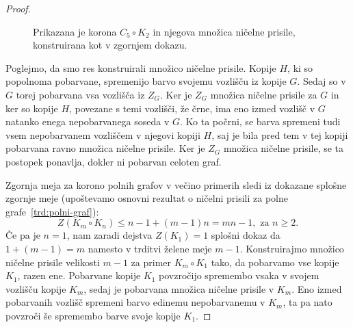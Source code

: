 \documentclass[12pt,a4paper,twoside]{article}
\theoremstyle{definition} %
\theoremstyle{plain} %
\numberwithin{equation}{section}  %
\begin{document}
\begin{proof}
\begin{figure}[h]
        \caption{Prikazana je korona $C_5 \circ K_2$ in njegova množica ničelne prisile, konstruirana kot v zgornjem dokazu.}
        \label{fig:zf-korona}
    \end{figure}
    
    Poglejmo, da smo res konstruirali množico ničelne prisile. Kopije $H$, ki so popolnoma pobarvane, spremenijo barvo svojemu vozlišču iz kopije $G$. Sedaj so v $G$ torej pobarvana vsa vozlišča iz $Z_G$. Ker je $Z_G$ množica ničelne prisile za $G$ in ker so kopije $H$, povezane s temi vozlišči, že črne, ima eno izmed vozlišč v $G$ natanko enega nepobarvanega soseda v $G$. Ko ta počrni, se barva spremeni tudi vsem nepobarvanem vozliščem v njegovi kopiji $H$, saj je bila pred tem v tej kopiji pobarvana ravno množica ničelne prisile. Ker je $Z_G$ množica ničelne prisile, se ta postopek ponavlja, dokler ni pobarvan celoten graf. 
    
    Zgornja meja za korono polnih grafov v večino primerih sledi iz dokazane splošne zgornje meje (upoštevamo osnovni rezultat o ničelni prisili za polne grafe~\ref{trd:polni-graf}):
    \[ Z(K_m \circ K_n) \leq n-1 + (m-1)n = mn - 1, \text{ za } n \geq 2.\]
    Če pa je $n = 1$, nam zaradi dejstva $Z(K_1) = 1$ splošni dokaz da $1 + (m-1) = m$ namesto v trditvi želene meje $m - 1$. Konstruirajmo množico ničelne prisile velikosti $m-1$ za primer $K_m \circ K_1$ tako, da pobarvamo vse kopije $K_1$, razen ene. Pobarvane kopije $K_1$ povzročijo spremembo vsaka v svojem vozlišču kopije $K_m$, sedaj je pobarvana množica ničelne prisile v $K_m$. Eno izmed pobarvanih vozlišč spremeni barvo edinemu nepobarvanemu v $K_m$, ta pa nato povzroči še spremembo barve svoje kopije $K_1$.
\end{proof}
\end{document}
